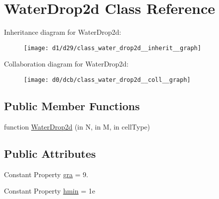 \hypertarget{class_water_drop2d}{}\section{Water\+Drop2d Class Reference}
\label{class_water_drop2d}


Inheritance diagram for Water\+Drop2d\+:
\nopagebreak
\begin{figure}[H]
\begin{center}
\leavevmode
\texttt{[image: d1/d29/class\_water\_drop2d\_\_inherit\_\_graph]}
\end{center}
\end{figure}


Collaboration diagram for Water\+Drop2d\+:
\nopagebreak
\begin{figure}[H]
\begin{center}
\leavevmode
\texttt{[image: d0/dcb/class\_water\_drop2d\_\_coll\_\_graph]}
\end{center}
\end{figure}
\subsection*{Public Member Functions}
\begin{DoxyCompactItemize}
\item 
function \hyperlink{class_water_drop2d_a9169669248f2680e6d38ecb1972efe94}{Water\+Drop2d} (in N, in M, in cell\+Type)
\end{DoxyCompactItemize}
\subsection*{Public Attributes}
\begin{DoxyCompactItemize}
\item 
Constant Property \hyperlink{class_water_drop2d_a000cbdfedee7a56666b20b5e9ba3a199}{gra} = 9.
\item 
Constant Property \hyperlink{class_water_drop2d_a91a6b3b778ec1c039ee5b50be2a93a01}{hmin} = 1e
\end{DoxyCompactItemize}
